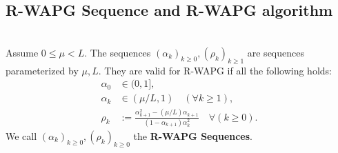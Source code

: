 \documentclass[12pt]{article}
\begin{document}
    \subsection{R-WAPG Sequence and R-WAPG algorithm}
        \begin{definition}\label{def:rwapg-seq}\;\\
            Assume $0 \le \mu < L$. 
            The sequences $(\alpha_k)_{k \ge 0}, (\rho_k)_{k \ge1}$ are sequences parameterized by $\mu, L$. 
            They are valid for R-WAPG if all the following holds: 
            \begin{align*}
                \alpha_0 &\in (0, 1], 
                \\
                \alpha_k &\in (\mu/L, 1) \quad (\forall k \ge 1), 
                \\
                \rho_k &:= \frac{\alpha_{k + 1}^2 - (\mu/L)\alpha_{k + 1}}{(1 - \alpha_{k + 1})\alpha_k^2} \quad \forall (k \ge 0). 
            \end{align*}
            We call $(\alpha_k)_{k \ge 0}, (\rho_k)_{k \ge 0}$ the \textbf{R-WAPG Sequences}. 
        \end{definition}
\end{document}
